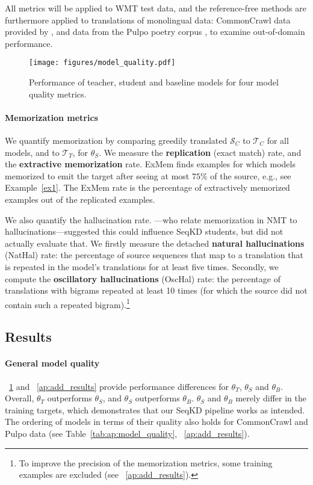 All metrics will be applied to WMT test data, and the reference-free methods are furthermore applied to translations of monolingual data: CommonCrawl data provided by \citet{barrault-etal-2020-findings}, and data from the Pulpo poetry corpus \citep{de2023alberti}, to examine out-of-domain performance.

\begin{figure}
    \centering
    \texttt{[image: figures/model\_quality.pdf]}
    \caption{Performance of teacher, student and baseline models for four model quality metrics.}
    \label{fig:model-quality}
    \vspace{-0.2cm}
\end{figure}

\paragraph{Memorization metrics}
We quantify memorization by comparing greedily translated $\mathcal{S}_C$ to $\mathcal{T}_C$ for all models, and to $\mathcal{T}_T$, for $\theta_S$. We measure the \textbf{replication} (exact match) rate, and the \textbf{extractive memorization} \citep[ExMem,][]{raunak2022finding} rate. ExMem finds examples for which models memorized to emit the target after seeing at most $75$\% of the source, e.g., see Example~\ref{ex1}.
The ExMem rate is the percentage of extractively memorized examples out of the replicated examples. 

We also quantify the hallucination rate. \citet{raunak2021curious}---who relate memorization in NMT to hallucinations---suggested this could influence SeqKD students, but did not actually evaluate that. We firstly measure the detached \textbf{natural hallucinations} (NatHal) rate: the percentage of source sequences that map to a translation that is repeated in the model's translations for at least five times.
Secondly, we compute the \textbf{oscillatory hallucinations} (OscHal) rate: the percentage of translations with bigrams repeated at least 10 times (for which the source did not contain such a repeated bigram).\footnote{To improve the precision of the memorization metrics, some training examples are excluded (see \appendixshortcut~\ref{ap:add_results}).} 

\subsection{Results}
\paragraph{General model quality}
\figureshortcut~\ref{fig:model-quality} and \appendixshortcut~\ref{ap:add_results} provide performance differences for $\theta_T$, $\theta_S$ and $\theta_B$.
Overall, $\theta_T$ outperforms $\theta_S$, and $\theta_S$ outperforms $\theta_B$. $\theta_S$ and $\theta_B$ merely differ in the training targets, which demonstrates that our SeqKD pipeline works as intended.
The ordering of models in terms of their quality also holds for CommonCrawl and Pulpo data (see Table~\ref{tab:ap:model_quality}, \appendixshortcut~\ref{ap:add_results}).

